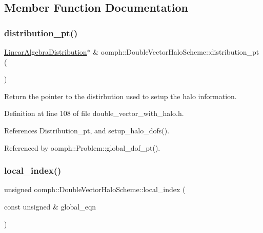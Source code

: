 \subsection{Member Function Documentation}
\mbox{\label{classoomph_1_1DoubleVectorHaloScheme_a269dd2eab9a60bfc4c6cf80a2689f6d6}} 
\subsubsection{\texorpdfstring{distribution\+\_\+pt()}{distribution\_pt()}}
{\footnotesize\ttfamily \hyperlink{classoomph_1_1LinearAlgebraDistribution}{Linear\+Algebra\+Distribution}$\ast$ \& oomph\+::\+Double\+Vector\+Halo\+Scheme\+::distribution\+\_\+pt (\begin{DoxyParamCaption}{ }\end{DoxyParamCaption})\hspace{0.3cm}{\ttfamily [inline]}}



Return the pointer to the distirbution used to setup the halo information. 



Definition at line 108 of file double\+\_\+vector\+\_\+with\+\_\+halo.\+h.



References Distribution\+\_\+pt, and setup\+\_\+halo\+\_\+dofs().



Referenced by oomph\+::\+Problem\+::global\+\_\+dof\+\_\+pt().

\mbox{\label{classoomph_1_1DoubleVectorHaloScheme_ad589a203cdd37bc2508930d8db845a49}} 
\subsubsection{\texorpdfstring{local\+\_\+index()}{local\_index()}}
{\footnotesize\ttfamily unsigned oomph\+::\+Double\+Vector\+Halo\+Scheme\+::local\+\_\+index (\begin{DoxyParamCaption}\item[{const unsigned \&}]{global\+\_\+eqn }\end{DoxyParamCaption})\hspace{0.3cm}{\ttfamily [inline]}}



